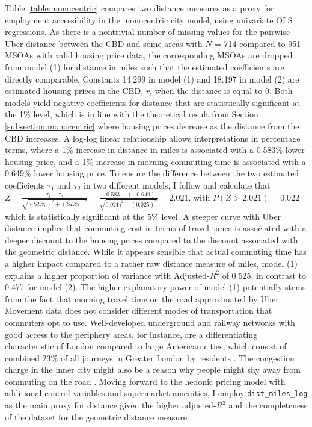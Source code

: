\documentclass{article}
\begin{document}
Table \ref{table:monocentric} compares two distance measures as a proxy for employment accessibility in the monocentric city model, using univariate OLS regressions. As there is a nontrivial number of missing values for the pairwise Uber distance between the CBD and some areas with $N$ = 714 compared to 951 MSOAs with valid housing price data, the corresponding MSOAs are dropped from model (1) for distance in miles such that the estimated coefficients are directly comparable. Constants 14.299 in model (1) and 18.197 in model (2) are estimated housing prices in the CBD, $\overline{r}$, when the distance is equal to 0. Both models yield negative coefficients for distance that are statistically significant at the 1\% level, which is in line with the theoretical result from Section \ref{subsection:monocentric} where housing prices decrease as the distance from the CBD increases. A log-log linear relationship allows interpretations in percentage terms, where a 1\% increase in distance in miles is associated with a 0.583\% lower housing price, and a 1\% increase in morning commuting time is associated with a 0.649\% lower housing price. To ensure the difference between the two estimated coefficients $\tau_1$ and $\tau_2$ in two different models, I follow \citet{Clogg1995StatisticalModels.} and calculate that $Z = \frac{\tau_1 - \tau_2}{\sqrt{(SE\tau_1)^2 + (SE\tau_2)^2}}  = \frac{-0.583 - (-0.649)}{\sqrt{0.021)^2 + (0.025)^2}} = 2.021$, with $P(Z > 2.021) = 0.022$  which is statistically significant at the 5\% level. A steeper curve with Uber distance implies that commuting cost in terms of travel times is associated with a deeper discount to the housing prices compared to the discount associated with the geometric distance. While it appears sensible that actual commuting time has a higher impact compared to a rather raw distance measure of miles, model (1) explains a higher proportion of variance with Adjusted-$R^2$ of 0.525, in contrast to 0.477 for model (2). The higher explanatory power of model (1) potentially stems from the fact that morning travel time on the road approximated by Uber Movement data does not consider different modes of transportation that commuters opt to use. Well-developed underground and railway networks with good access to the periphery areas, for instance, are a differentiating characteristic of London compared to large American cities, which consist of combined 23\% of all journeys in Greater London by residents \citep{TransportforLondon2016TravelLondon}. The congestion charge in the inner city might also be a reason why people might shy away from commuting on the road \citep{TransportforLondon2019CongestionCharge}. Moving forward to the hedonic pricing model with additional control variables and supermarket amenities, I employ \texttt{dist\_miles\_log} as the main proxy for distance given the higher adjusted-$R^2$ and the completeness of the dataset for the geometric distance measure.
\end{document}
